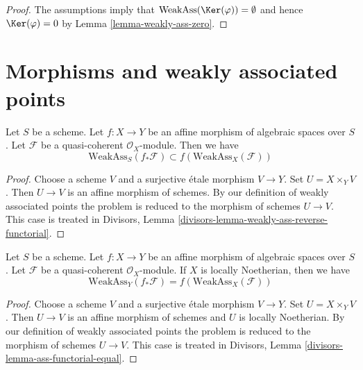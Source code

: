 \begin{proof}
The assumptions imply that $\text{WeakAss}(\Ker(\varphi)) = \emptyset$
and hence $\Ker(\varphi) = 0$ by Lemma \ref{lemma-weakly-ass-zero}.
\end{proof}










\section{Morphisms and weakly associated points}
\label{section-morphisms-weakly-associated}

\begin{lemma}
\label{lemma-weakly-ass-reverse-functorial}
Let $S$ be a scheme.
Let $f : X \to Y$ be an affine morphism of algebraic spaces over $S$.
Let $\mathcal{F}$ be a quasi-coherent $\mathcal{O}_X$-module.
Then we have
$$
\text{WeakAss}_S(f_*\mathcal{F}) \subset f(\text{WeakAss}_X(\mathcal{F}))
$$
\end{lemma}

\begin{proof}
Choose a scheme $V$ and a surjective \'etale morphism $V \to Y$.
Set $U = X \times_Y V$. Then $U \to V$ is an affine morphism
of schemes. By our definition of weakly associated points
the problem is reduced to the morphism of schemes $U \to V$. This case is
treated in Divisors, Lemma \ref{divisors-lemma-weakly-ass-reverse-functorial}.
\end{proof}

\begin{lemma}
\label{lemma-ass-functorial-equal}
Let $S$ be a scheme.
Let $f : X \to Y$ be an affine morphism of algebraic spaces over $S$.
Let $\mathcal{F}$ be a quasi-coherent $\mathcal{O}_X$-module.
If $X$ is locally Noetherian, then we have
$$
\text{WeakAss}_Y(f_*\mathcal{F}) =
f(\text{WeakAss}_X(\mathcal{F}))
$$
\end{lemma}

\begin{proof}
Choose a scheme $V$ and a surjective \'etale morphism $V \to Y$.
Set $U = X \times_Y V$. Then $U \to V$ is an affine morphism
of schemes and $U$ is locally Noetherian.
By our definition of weakly associated points
the problem is reduced to the morphism of schemes $U \to V$. This case is
treated in Divisors, Lemma \ref{divisors-lemma-ass-functorial-equal}.
\end{proof}

